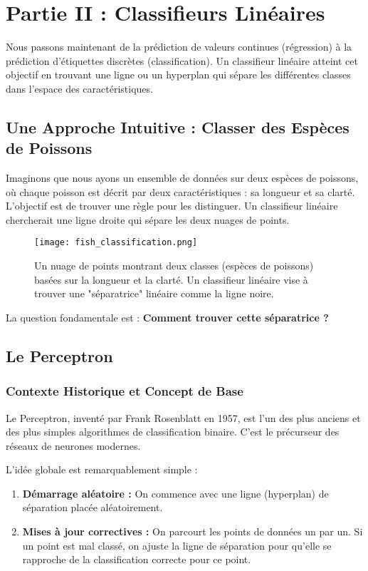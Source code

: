 \documentclass[12pt]{article}
\begin{document}
\newpage
\section{Partie II : Classifieurs Linéaires}
Nous passons maintenant de la prédiction de valeurs continues (régression) à la prédiction d'étiquettes discrètes (classification). Un classifieur linéaire atteint cet objectif en trouvant une ligne ou un hyperplan qui sépare les différentes classes dans l'espace des caractéristiques.

\subsection{Une Approche Intuitive : Classer des Espèces de Poissons}
Imaginons que nous ayons un ensemble de données sur deux espèces de poissons, où chaque poisson est décrit par deux caractéristiques : sa longueur et sa clarté. L'objectif est de trouver une règle pour les distinguer. Un classifieur linéaire chercherait une ligne droite qui sépare les deux nuages de points.

\begin{figure}[h!]
    \centering
    \texttt{[image: fish\_classification.png]}
    \caption{Un nuage de points montrant deux classes (espèces de poissons) basées sur la longueur et la clarté. Un classifieur linéaire vise à trouver une "séparatrice" linéaire comme la ligne noire.}
    \label{fig:fish}
\end{figure}

La question fondamentale est : \textbf{Comment trouver cette séparatrice ?}

\subsection{Le Perceptron}

\subsubsection{Contexte Historique et Concept de Base}
Le Perceptron, inventé par Frank Rosenblatt en 1957, est l'un des plus anciens et des plus simples algorithmes de classification binaire. C'est le précurseur des réseaux de neurones modernes.

L'idée globale est remarquablement simple :
\begin{enumerate}
    \item \textbf{Démarrage aléatoire :} On commence avec une ligne (hyperplan) de séparation placée aléatoirement.
    \item \textbf{Mises à jour correctives :} On parcourt les points de données un par un. Si un point est mal classé, on ajuste la ligne de séparation pour qu'elle se rapproche de la classification correcte pour ce point.
\end{enumerate}
\end{document}
